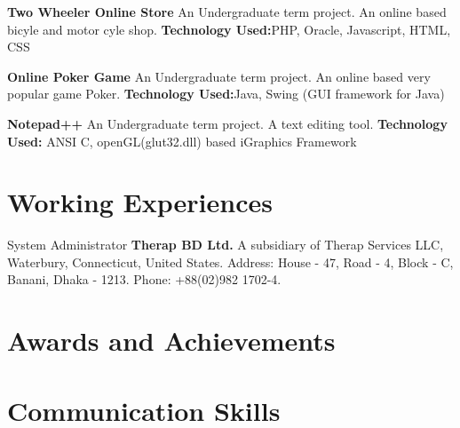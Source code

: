 \documentclass[11pt,a4paper,sans]{moderncv}
\begin{document}
{
\textbf{Two Wheeler Online Store}
\newline
An Undergraduate term project. An online based bicyle and motor cyle shop.
\newline \textbf{Technology Used:}PHP, Oracle, Javascript, HTML, CSS
\newline
}

{
\textbf{Online Poker Game}
\newline
An Undergraduate term project. An online based very popular game Poker.
\newline \textbf{Technology Used:}Java, Swing (GUI framework for Java)
\newline
}

{
\textbf{Notepad++}\newline
An Undergraduate term project. A text editing tool.
\newline \textbf{Technology Used:} ANSI C, openGL(glut32.dll) based iGraphics Framework
\newline
}




\section{Working Experiences}
{
System Administrator \newline
\textbf{Therap BD Ltd.\newline}
A subsidiary of Therap Services LLC, Waterbury, Connecticut, United States.\newline
Address: House - 47, Road - 4, Block - C, Banani, Dhaka - 1213. \newline
Phone: +88(02)982 1702-4.
}

\section{Awards and Achievements}



\section{Communication Skills}


\end{document}
